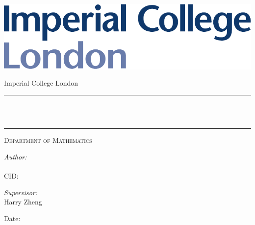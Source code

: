 \begin{titlepage}

\newcommand{\HRule}{\rule{\linewidth}{0.5mm}} %


\includegraphics[scale=0.5]{./figures/imperial}


\begin{center} %

\vspace{2.5cm}
{\LARGE Imperial College London}
\vspace{3cm}
\textsc{\LARGE \reporttype}

\HRule \\[0.4cm]
{ \huge \bfseries \reporttitle}\\ 
\HRule
\vspace{1cm}
\textsc{\Large Department of Mathematics}\\[0.5cm] 
\end{center}
\vfill
 \large
 \begin{multicols}{2}
 \textit{Author:}\\
\reportauthor \\ CID: \cid %
\begin{flushright}
    \textit{Supervisor:}\\Harry Zheng 
\end{flushright}
\end{multicols}
\vspace{1.5cm}
\makeatletter
Date: \@date 




\makeatother


\end{titlepage}


